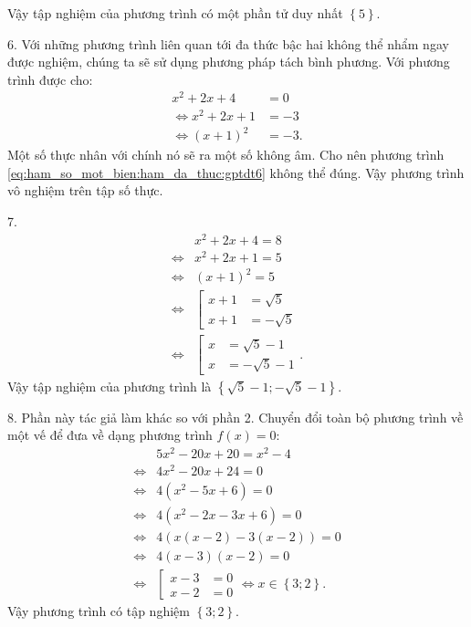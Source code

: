 Vậy tập nghiệm của phương trình có một phần tử duy nhất $\displaystyle\left\{5\right\}$.

6. Với những phương trình liên quan tới đa thức bậc hai không thể nhẩm ngay được nghiệm, chúng ta sẽ sử dụng phương pháp tách bình phương. Với phương trình được cho:
\begin{align}
   x^2 + 2x + 4 &= 0 \nonumber\\ 
   \iff x^2 + 2x + 1 &= -3 \nonumber\\
   \iff (x + 1)^2 &= -3. \label{eq:ham_so_mot_bien:ham_da_thuc:gptdt6}
\end{align}
Một số thực nhân với chính nó sẽ ra một số không âm. Cho nên phương trình \ref{eq:ham_so_mot_bien:ham_da_thuc:gptdt6} không thể đúng. Vậy phương trình vô nghiệm trên tập số thực.

7. 
\begin{align*}
   &x^2 + 2x + 4 = 8 \\ 
   \iff &x^2 + 2x + 1 = 5 \\
   \iff &(x + 1)^2 = 5 \\
   \iff &\left[
      \begin{aligned}
         x + 1 &= \sqrt{5} \\
         x + 1 &= -\sqrt{5}
      \end{aligned}
   \right. \\
   \iff &\left[
      \begin{aligned}
         x &= \sqrt{5} - 1 \\
         x &= -\sqrt{5} - 1
      \end{aligned}
   \right..
\end{align*}
Vậy tập nghiệm của phương trình là $\displaystyle\left\{\sqrt{5} - 1; -\sqrt{5} - 1\right\}$.

8. Phần này tác giả làm khác so với phần 2. Chuyển đổi toàn bộ phương trình về một vế để đưa về dạng phương trình $f(x) = 0$:
\begin{align*}
   &5x^2 - 20x + 20 = x^2 - 4 \\
   \iff &4x^2 - 20x + 24 = 0 \\
   \iff &4\left(x^2 - 5x + 6\right) = 0 \\
   \iff &4\left(x^2 - 2x - 3x + 6\right) = 0 \\
   \iff &4\left(x(x - 2) - 3(x - 2)\right) = 0 \\
   \iff &4(x - 3)(x - 2) = 0 \\
   \iff &\left[
      \begin{aligned}
         x - 3 &= 0 \\
         x - 2 &= 0
      \end{aligned}
   \right. \iff x \in \left\{3; 2\right\}. 
\end{align*}
Vậy phương trình có tập nghiệm $\left\{3; 2\right\}$.

